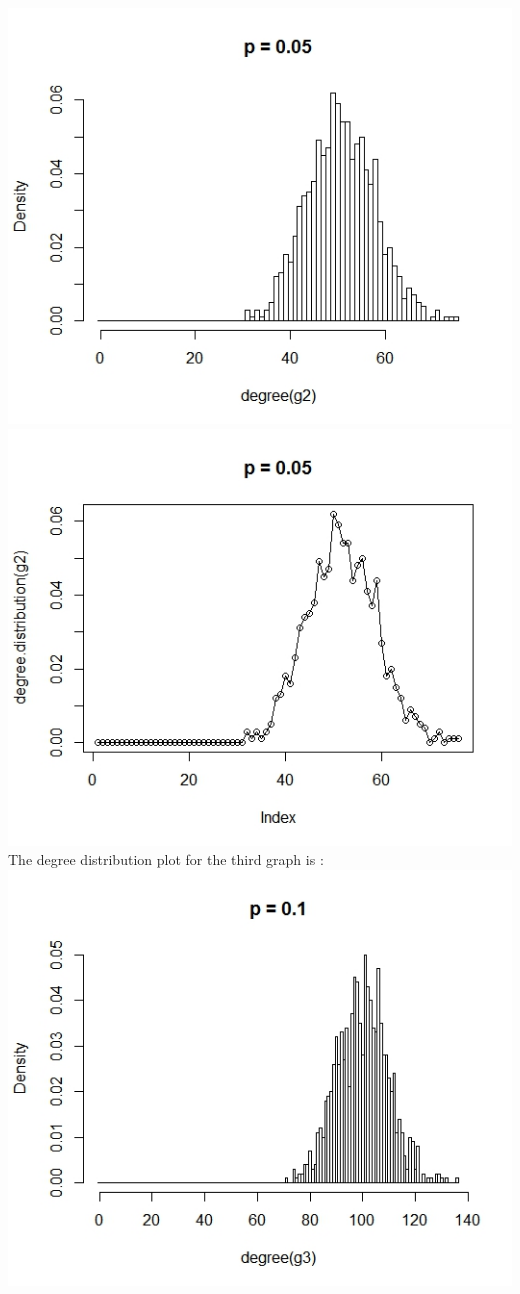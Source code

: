 \documentclass{article}
\begin{document}
\includegraphics[scale=0.4]{pa5} \\
\includegraphics[scale=0.4]{pa6} \\
The degree distribution plot for the third graph is :\\
\includegraphics[scale=0.4]{pa9} \\
\end{document}
